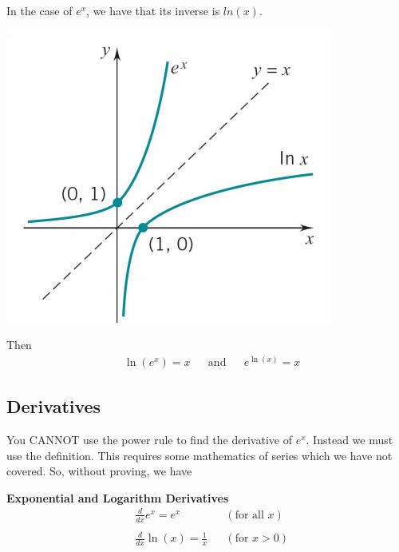 \documentclass[14pt]{extarticle}
\begin{document}
In the case of $e^x$, we have that its inverse is $ln(x)$.
\begin{center}
	\includegraphics[width=0.5\linewidth]{10-2-1}
\end{center}
Then
\begin{align*}
	&\ln(e^x) = x & & \text{and} & &e^{\ln(x)} = x 
\end{align*}
\subsection{Derivatives}
You CANNOT use the power rule to find the derivative of $e^x$. Instead we must use the definition. This requires some mathematics of series which we have not covered. So, without proving, we have
\begin{tcolorbox}[enhanced jigsaw,colback=bg,boxrule=0pt,arc=0pt]
	\textbf{Exponential and Logarithm Derivatives}
	\begin{align*}
		&\frac{d}{dx}e^x =  e^x & &(\text{for all } x) \\\\
		&\frac{d}{dx}\ln(x) =  \frac{1}{x} & &(\text{for } x>0)
	\end{align*}
\end{tcolorbox}
\end{document}
